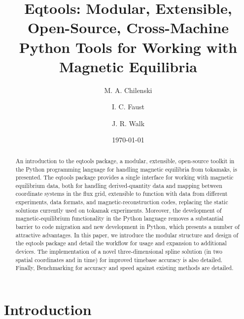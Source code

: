 \documentclass[12pt,floatfix,showpacs]{revtex4-1}
\newcommand{\gnote}[1]{\marginpar{\textcolor{red}{\scriptsize{#1}}}}
\begin{document}
\title{Eqtools: Modular, Extensible, Open-Source, Cross-Machine Python Tools for Working with Magnetic Equilibria}

\author{M. A. Chilenski}

\author{I. C. Faust}

\author{J. R. Walk}

\date{\today}

\begin{abstract}
 An introduction to the eqtools package, a modular, extensible, open-source toolkit in the Python programming language for handling magnetic equilibria from tokamaks, is presented.  The eqtools package provides a single interface for working with magnetic equilibrium data, both for handling derived-quantity data and mapping between coordinate systems in the flux grid, extensible to function with data from different experiments, data formats, and magnetic-reconstruction codes, replacing the static solutions currently used on tokamak experiments.  Moreover, the development of magnetic-equilibrium functionality in the Python language removes a substantial barrier to code migration and new development in Python, which presents a number of attractive advantages.  In this paper, we introduce the modular structure and design of the eqtools package and detail the workflow for usage and expansion to additional devices.  The implementation of a novel three-dimensional spline solution (in two spatial coordinates and in time) for improved timebase accuracy is also detailed.  Finally, Benchmarking for accuracy and speed against existing methods are detailed.
\end{abstract}
\gnote{other PACs numbers?}


\maketitle


\section{Introduction}\label{sec:intro}
\end{document}
